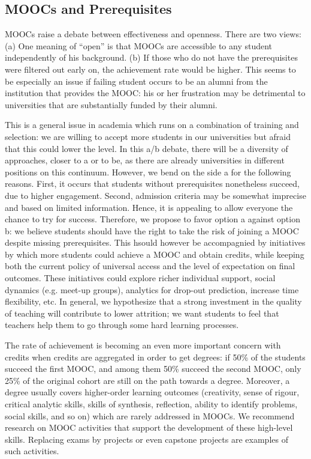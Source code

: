 \subsection{MOOCs and Prerequisites}

MOOCs raise a debate between effectiveness and openness. There are two
views: (a) One meaning of  ``open''  is that MOOCs are accessible to any
student independently of his background. (b) If those who do not have the prerequisites were filtered
out early on, the achievement rate would be higher. This seems to be especially
an issue if failing student occurs to be an alumni from the institution that provides the
MOOC: his or her frustration may be detrimental to
universities that are substantially funded by their alumni.

This is a general issue in academia which runs on a combination of training and selection: we are willing to
accept more students in our universities but afraid that this could lower the level.
In this a/b debate, there will be a diversity of approaches, closer to a or to be, 
as there are already universities in different positions on this continuum. However,
we bend on the side a for the following reasons. 
First, it occurs that students without prerequisites nonetheless succeed, due to higher
engagement. Second,  admission criteria may be somewhat
imprecise and based on limited information. Hence, it is appealing to allow
everyone the chance to try for success. Therefore, we propose to favor option a against option b: 
we believe students should have the right to take the risk of joining a MOOC despite missing
prerequisites. This hsould however be accompagnied by initiatives by which more students
could achieve a MOOC and obtain credits, while keeping both the current
policy of universal access and the level of expectation on final outcomes. 
These initiatives could explore richer
individual support, social dynamics (e.g. meet-up groups), analytics for
drop-out prediction, increase time flexibility, etc. In general, we
hypothesize that a strong investment in the quality of teaching will
contribute to lower attrition; we want students to feel that teachers
help them to go through some hard learning processes. 

The rate of achievement is becoming an even more important concern with
credits when credits are  aggregated in order to get degrees:
if 50\% of the students succeed the first MOOC, and among them 50\%
succeed the second MOOC, only 25\% of the original cohort are still on
the path towards a degree. Moreover, a degree usually covers
higher-order learning outcomes (creativity, sense of rigour, critical
analytic skills, skills of synthesis, reflection, ability to identify
problems, social skills, and so on) which are rarely addressed in MOOCs. We
recommend research on MOOC activities that support the development of
these high-level skills. Replacing exams by projects or even capstone
projects are examples of such activities.


